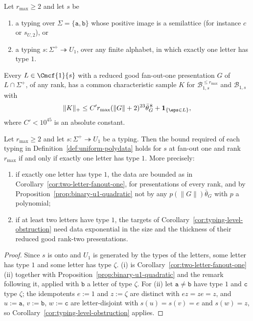 \begin{corollary}
\label{cor:two-letter-fanout-one}
Let $r_{\max}\ge2$ and let $s$ be
\begin{enumerate}[label=\textup{(\roman*)},leftmargin=*]
\item a typing over $\Sigma=\{\mathtt a,\mathtt b\}$ whose positive image is a
semilattice \textup(for instance $c$ or $s_{U,2}$\textup), or
\item a typing $s:\Sigma^+\twoheadrightarrow U_1$, over any finite alphabet,
in which exactly one letter has type $1$.
\end{enumerate}
Every $L\in\Cmcf{1}{s}$ with a reduced good fan-out-one presentation $G$ of
$L\cap\Sigma^+$, of any rank, has a common characteristic sample $K$ for
$\mathcal B^{\le r_{\max}}_{1,s}$ and $\mathcal B_{1,s}$ with
\[
 \|K\|_+\le C'r_{\max}(\|G\|+2)^{23}\bar\theta_G^{\,8}+\mathbf 1_{\{\eps\in L\}},
\]
where $C'<10^{45}$ is an absolute constant.
\end{corollary}

\begin{corollary}
\label{cor:u1-classification}
Let $r_{\max}\ge2$ and let $s:\Sigma^+\twoheadrightarrow U_1$ be a typing.  Then
the bound required of each typing in Definition~\ref{def:uniform-polydata}
holds for $s$ at fan-out one and rank $r_{\max}$ if and only if exactly one
letter has type $1$.  More precisely:
\begin{enumerate}[label=\textup{(\roman*)},leftmargin=*]
\item if exactly one letter has type $1$, the data are bounded as in
Corollary~\ref{cor:two-letter-fanout-one}, for presentations of every rank, and
by Proposition~\ref{prop:binary-u1-quadratic} not by any $p(\|G\|)\bar\theta_G$
with $p$ a polynomial;
\item if at least two letters have type $1$, the targets of
Corollary~\ref{cor:typing-level-obstruction} need data exponential in the size
and the thickness of their reduced good rank-two presentations.
\end{enumerate}
\end{corollary}

\begin{proof}
Since $s$ is onto and $U_1$ is generated by the types of the letters, some letter
has type $1$ and some letter has type $\zeta$.  (i) is
Corollary~\ref{cor:two-letter-fanout-one}(ii) together with
Proposition~\ref{prop:binary-u1-quadratic} and the remark following it, applied
with $\mathtt b$ a letter of type $\zeta$.  For (ii) let $\mathtt a\ne\mathtt b$ have
type $1$ and $\mathtt c$ type $\zeta$; the idempotents $e:=1$ and $z:=\zeta$ are
distinct with $ez=ze=z$, and $u:=\mathtt a$, $v:=\mathtt b$, $w:=\mathtt c$ are
letter-disjoint with $s(u)=s(v)=e$ and $s(w)=z$, so
Corollary~\ref{cor:typing-level-obstruction} applies.
\end{proof}

